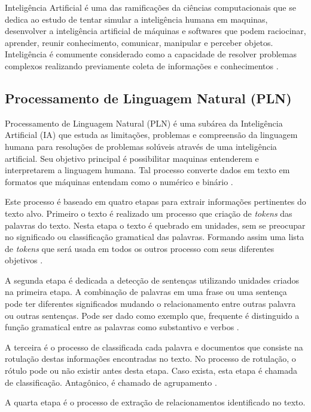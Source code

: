 Inteligência Artificial é uma das ramificações da ciências computacionais que se dedica ao estudo de tentar simular a inteligência humana em maquinas, desenvolver a inteligência artificial de máquinas e softwares que podem raciocinar, aprender, reunir conhecimento, comunicar, manipular e perceber objetos. Inteligência é comumente considerado como a capacidade de resolver problemas complexos realizando previamente coleta de informações e conhecimentos \cite{Pannu:2015}.

\noindent {}

\subsection{Processamento de Linguagem Natural (PLN)} Processamento de Linguagem Natural (PLN) é uma subárea da Inteligência Artificial (IA) que estuda as limitações, problemas e compreensão da linguagem humana para resoluções de problemas solúveis através de uma inteligência artificial.  Seu objetivo principal é possibilitar maquinas entenderem e interpretarem a linguagem humana. Tal processo converte dados em texto em formatos que máquinas entendam como o numérico e binário \cite{Kulkarni:2019}.

Este processo é baseado em quatro etapas para extrair informações pertinentes do texto alvo. Primeiro o texto é realizado um processo que criação de \textit{tokens} das palavras do texto. Nesta etapa o texto é quebrado em unidades, sem se preocupar no significado ou classificação gramatical das palavras. Formando assim uma lista de \textit{tokens} que será usada em todos os outros processo com seus diferentes objetivos \cite{Reese:2015}.

A segunda etapa é dedicada a detecção de sentenças utilizando unidades criados na primeira etapa. A combinação de palavras em uma frase ou uma sentença pode ter diferentes significados mudando o relacionamento entre outras palavra ou outras sentenças. Pode ser dado como exemplo que, frequente é distinguido a função gramatical entre as palavras como substantivo e verbos \cite{Reese:2015}.

A terceira é o processo de classificada cada palavra e documentos que consiste na rotulação destas informações encontradas no texto. No processo de rotulação, o rótulo pode ou não existir antes desta etapa. Caso exista, esta etapa é chamada de classificação. Antagônico, é chamado de agrupamento \cite{Reese:2015}.

A quarta etapa é o processo de extração de relacionamentos identificado no texto.
